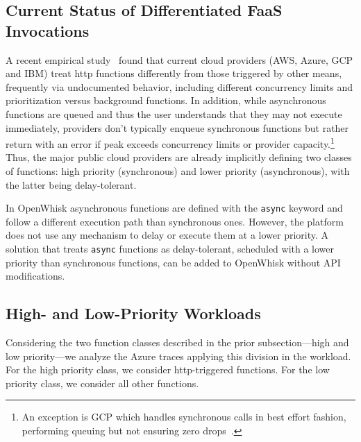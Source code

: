 \subsection{Current Status of Differentiated FaaS Invocations}
\label{sec:motivation:currentStatus}
A recent empirical study~\cite{Tariq:SOCC:2020:Sequoia} found that current cloud providers (AWS, Azure, GCP and IBM) treat http functions differently from those triggered by other means, frequently via undocumented behavior, including different concurrency limits and prioritization versus background functions.
In addition, while asynchronous functions are queued and thus the user understands that they may not execute immediately, providers don't typically enqueue synchronous functions but rather return with an error if peak exceeds concurrency limits or provider capacity.\footnote{An exception is GCP which handles synchronous calls in best effort fashion, performing queuing but not ensuring zero drops~\cite{Tariq:SOCC:2020:Sequoia}.}
%
Thus, the major public cloud providers are already implicitly defining two classes of functions: high priority (synchronous) and lower priority (asynchronous), with the latter being delay-tolerant.

In OpenWhisk asynchronous functions are defined with the \texttt{async} keyword and follow a different execution path than synchronous ones.
However, the platform does not use any mechanism to delay or execute them at a lower priority.
A solution that treats \texttt{async} functions as delay-tolerant, scheduled with a lower priority than synchronous functions, can be added to OpenWhisk without API modifications.

\subsection{High- and Low-Priority Workloads}
\label{sec:motivation:workload}
Considering the two function classes described in the prior subsection---high and low priority---we analyze the Azure traces applying this division in the workload.
For the high priority class, we consider http-triggered functions.
For the low priority class, we consider all other functions.

